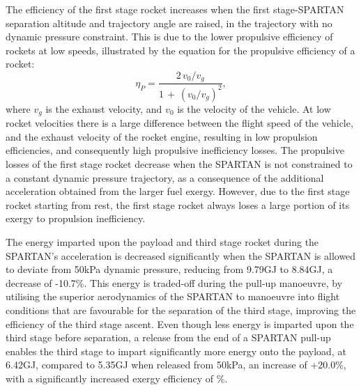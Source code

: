  The efficiency of the first stage rocket increases when the first stage-SPARTAN separation altitude and trajectory angle are raised, in the trajectory with no dynamic pressure constraint. 
 This is due to the lower propulsive efficiency of rockets at low speeds, illustrated by the equation for the propulsive efficiency of a rocket\cite{RPE}:
 \begin{equation}\label{eq:rocketeff}
 \eta_P = \frac{2\,v_0/v_g}{1\,+\,(v_0/v_g)^2}, 
 \end{equation}
 where $v_g$ is the exhaust velocity, and $v_0$ is the velocity of the vehicle.
 At low rocket velocities there is a large difference between the flight speed of the vehicle, and the exhaust velocity of the rocket engine, resulting in low propulsion efficiencies, and consequently high propulsive inefficiency losses. 
 The propulsive losses of the first stage rocket decrease when the SPARTAN is not constrained to a constant dynamic pressure trajectory, as a consequence of the additional acceleration obtained from the larger fuel exergy. 
 However, due to the first stage rocket starting from rest, the first stage rocket always loses a large portion of its exergy to propulsion inefficiency.  
 
The energy imparted upon the payload and third stage rocket during the SPARTAN's acceleration is decreased significantly when the SPARTAN is allowed to deviate from 50kPa dynamic pressure, reducing from 9.79GJ to 8.84GJ, a decrease of -10.7\%. This energy is traded-off during the pull-up manoeuvre, by utilising the superior aerodynamics of the SPARTAN to manoeuvre into flight conditions that are favourable for the separation of the third stage, improving the efficiency of the third stage ascent. Even though less energy is imparted upon the third stage before separation, a release from the end of a SPARTAN pull-up enables the third stage to impart significantly more energy onto the payload, at 6.42GJ, compared to 5.35GJ when released from 50kPa, an increase of +20.0\%, with a significantly increased exergy efficiency of \thirddExergyEffStandardNoReturn \%.  

